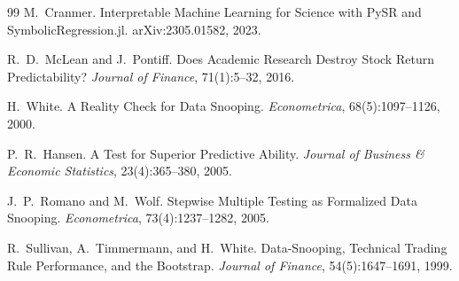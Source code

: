 \documentclass[11pt]{article}
\begin{document}
\begin{thebibliography}{99}
 M.~Cranmer.
\newblock Interpretable Machine Learning for Science with PySR and SymbolicRegression.jl.
\newblock arXiv:2305.01582, 2023.


 R.~D.~McLean and J.~Pontiff.
\newblock Does Academic Research Destroy Stock Return Predictability?
\newblock \emph{Journal of Finance}, 71(1):5--32, 2016.


 H.~White.
\newblock A Reality Check for Data Snooping.
\newblock \emph{Econometrica}, 68(5):1097--1126, 2000.

 P.~R.~Hansen.
\newblock A Test for Superior Predictive Ability.
\newblock \emph{Journal of Business \& Economic Statistics}, 23(4):365--380, 2005.

 J.~P.~Romano and M.~Wolf.
\newblock Stepwise Multiple Testing as Formalized Data Snooping.
\newblock \emph{Econometrica}, 73(4):1237--1282, 2005.

 R.~Sullivan, A.~Timmermann, and H.~White.
\newblock Data-Snooping, Technical Trading Rule Performance, and the Bootstrap.
\newblock \emph{Journal of Finance}, 54(5):1647--1691, 1999.

\end{thebibliography}
\end{document}
